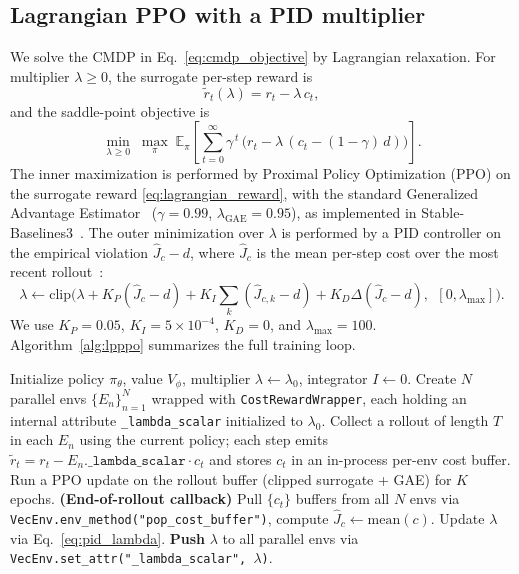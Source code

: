 \documentclass[11pt,a4paper]{article}
\begin{document}
\subsection{Lagrangian PPO with a PID multiplier}

We solve the CMDP in Eq.~\eqref{eq:cmdp_objective} by Lagrangian
relaxation. For multiplier $\lambda\ge 0$, the surrogate per-step
reward is
\begin{equation}
\tilde r_t(\lambda) = r_t - \lambda\,c_t,
\label{eq:lagrangian_reward}
\end{equation}
and the saddle-point objective is
\begin{equation}
\min_{\lambda\ge 0}\;\max_{\pi}\;
\mathbb{E}_\pi\!\left[\sum_{t=0}^{\infty}\gamma^{\,t}\,
                 \big(r_t - \lambda\,(c_t - (1-\gamma)\,d)\big)\right].
\label{eq:saddle}
\end{equation}
The inner maximization is performed by Proximal Policy Optimization
(PPO) on the surrogate reward \eqref{eq:lagrangian_reward}, with the
standard Generalized Advantage Estimator~\citep{schulman2015gae}
($\gamma=0.99$, $\lambda_{\mathrm{GAE}}=0.95$), as implemented in
Stable-Baselines3~\citep{raffin2021sb3}. The outer minimization over $\lambda$ is
performed by a PID controller on the empirical violation
$\hat J_c - d$, where $\hat J_c$ is the mean per-step cost over the
most recent rollout~\citep{stooke2020responsive}:
\begin{equation}
\lambda \leftarrow \mathrm{clip}\Big(
   \lambda + K_P(\hat J_c - d) + K_I\!\!\sum_{k}(\hat J_{c,k}-d)
   + K_D\Delta(\hat J_c-d),\;\,
   [0,\lambda_{\max}]\Big).
\label{eq:pid_lambda}
\end{equation}
We use $K_P=0.05$, $K_I=5\times 10^{-4}$, $K_D=0$, and
$\lambda_{\max}=100$. Algorithm~\ref{alg:lpppo} summarizes the full
training loop.

\begin{algorithm}[t]
\caption{Lagrangian PPO with PID multiplier and subprocess-safe
$\lambda$ propagation.}
\label{alg:lpppo}
\begin{algorithmic}[1]
\State Initialize policy $\pi_\theta$, value $V_\phi$, multiplier
       $\lambda \leftarrow \lambda_0$, integrator $I\leftarrow 0$.
\State Create $N$ parallel envs $\{E_n\}_{n=1}^N$ wrapped with
       \texttt{CostRewardWrapper}, each holding an internal
       attribute \texttt{\_lambda\_scalar} initialized to $\lambda_0$.
  \State Collect a rollout of length $T$ in each $E_n$ using the
         current policy; each step emits
         $\tilde r_t = r_t - E_n.\texttt{\_lambda\_scalar}\cdot c_t$
         and stores $c_t$ in an in-process per-env cost buffer.
  \State Run a PPO update on the rollout buffer (clipped surrogate
         + GAE) for $K$ epochs.
  \State \textbf{(End-of-rollout callback)} Pull
         $\{c_t\}$ buffers from all $N$ envs via
         \texttt{VecEnv.env\_method("pop\_cost\_buffer")}, compute
         $\hat J_c \leftarrow \mathrm{mean}(c)$.
  \State Update $\lambda$ via Eq.~\eqref{eq:pid_lambda}.
  \State \textbf{Push} $\lambda$ to all parallel envs via
         \texttt{VecEnv.set\_attr("\_lambda\_scalar",~$\lambda$)}.
\EndFor
\end{algorithmic}
\end{algorithm}
\end{document}
